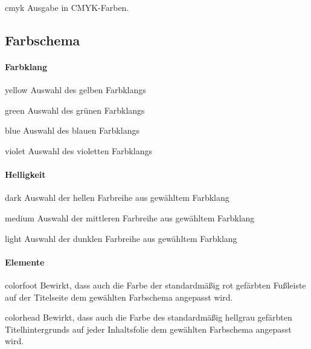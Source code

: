 \documentclass[cmyk,a4paper,colorscheme=green,TUBStitlepage=picture]{tubsreprt}
\begin{document}
\begin{classoption}{cmyk}
  Ausgabe in CMYK-Farben.
\end{classoption}


\subsection{Farbschema}

\paragraph{Farbklang}
\begin{themeoption}{yellow}
  Auswahl des gelben Farbklangs
\end{themeoption}
\begin{themeoption}{green}
  Auswahl des grünen Farbklangs
\end{themeoption}
\begin{themeoption}{blue}
  Auswahl des blauen Farbklangs
\end{themeoption}
\begin{themeoption}{violet}
  Auswahl des violetten Farbklangs
\end{themeoption}
\paragraph{Helligkeit}
\begin{themeoption}{dark}
  Auswahl der hellen Farbreihe aus gewähltem Farbklang
\end{themeoption}
\begin{themeoption}{medium}
  Auswahl der mittleren Farbreihe aus gewähltem Farbklang
\end{themeoption}
\begin{themeoption}{light}
  Auswahl der dunklen Farbreihe aus gewähltem Farbklang
\end{themeoption}
\paragraph{Elemente}
\begin{themeoption}{colorfoot}
  Bewirkt, dass auch die Farbe der standardmäßig rot gefärbten Fußleiste auf
  der Titelseite dem gewählten Farbschema angepasst wird.
\end{themeoption}
\begin{themeoption}{colorhead}
  Bewirkt, dass auch die Farbe des standardmäßig hellgrau gefärbten
  Titelhintergrunds auf jeder Inhaltsfolie
  dem gewählten Farbschema angepasst wird.
\end{themeoption}
\end{document}

